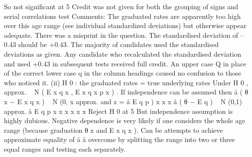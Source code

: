 So not significant at 5%
Credit was not given for both the grouping of signs and serial correlations
test
Comments: The graduated rates are apparently too high over this age
range (see individual standardized deviations) but otherwise appear
adequate.
There was a misprint in the question. The standardised deviation of –0.43
should be +0.43. The majority of candidates used the standardised
deviations as given. Any candidate who recalculated the standardised
deviation and used +0.43 in subsequent tests received full credit. An upper
case Q in place of the correct lower case q in the column headings caused no
confusion to those who noticed it.
(ii)
H 0 :
the graduated rates = true underlying rates
Under H 0 , approx. ~ N ( E x q x , E x q x p x ) .
If independence can be assumed then
å ( θ
x
− E x q x ) ~ N (0,
x
approx. and
z =
å E q p )
x
x
x
å ( θ − E q ) ~ N (0,1) approx.
å E q p
x
x
x
x
x
x
Reject H 0 at 5%
But independence assumption is highly dubious. Negative dependence is
very likely if one considers the whole age range (because graduation
θ x and
E x q x ). Can be
attempts to achieve approximate equality of
å
å
overcome by splitting the range into two or three equal ranges and testing
each separately.
